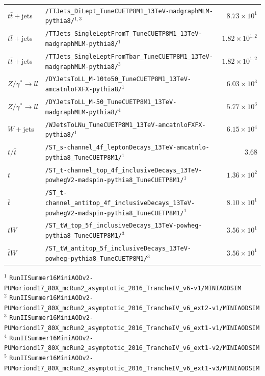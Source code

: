 \begin{landscape}
\begin{longtable}{lp{6.0in}r}
\midrule
$t\bar{t}+$jets & \texttt{/TTJets\_DiLept\_TuneCUETP8M1\_13TeV-madgraphMLM-pythia8/}$^{1,3}$ & $8.73 \times 10^{1}$ \\
$t\bar{t}+$jets & \texttt{/TTJets\_SingleLeptFromT\_TuneCUETP8M1\_13TeV-madgraphMLM-pythia8/}$^{1}$ & $1.82 \times 10^{1,2}$ \\
$t\bar{t}+$jets & \texttt{/TTJets\_SingleLeptFromTbar\_TuneCUETP8M1\_13TeV-madgraphMLM-pythia8/}$^{3}$ & $1.82 \times 10^{1,2}$ \\
$Z/\gamma^{*}\rightarrow ll$ & \texttt{/DYJetsToLL\_M-10to50\_TuneCUETP8M1\_13TeV-amcatnloFXFX-pythia8/}$^{1}$ & $6.03 \times 10^{3}$ \\
$Z/\gamma^{*}\rightarrow ll$ & \texttt{/DYJetsToLL\_M-50\_TuneCUETP8M1\_13TeV-madgraphMLM-pythia8/}$^{4}$ & $5.77 \times 10^{3}$ \\
$W+$jets & \texttt{/WJetsToLNu\_TuneCUETP8M1\_13TeV-amcatnloFXFX-pythia8/}$^{1}$ & $6.15 \times 10^{4}$ \\
$t/\bar{t}$ & \texttt{/ST\_s-channel\_4f\_leptonDecays\_13TeV-amcatnlo-pythia8\_TuneCUETP8M1/}$^{1}$ & $3.68$ \\
$t$ & \texttt{/ST\_t-channel\_top\_4f\_inclusiveDecays\_13TeV-powhegV2-madspin-pythia8\_TuneCUETP8M1/}$^{1}$ & $1.36 \times 10^{2}$ \\
$\bar{t}$ & \texttt{/ST\_t-channel\_antitop\_4f\_inclusiveDecays\_13TeV-powhegV2-madspin-pythia8\_TuneCUETP8M1/}$^{1}$ & $8.10 \times 10^{1}$ \\
$tW$ & \texttt{/ST\_tW\_top\_5f\_inclusiveDecays\_13TeV-powheg-pythia8\_TuneCUETP8M1/}$^{3}$ & $3.56 \times 10^{1}$ \\
$\bar{t}W$ & \texttt{/ST\_tW\_antitop\_5f\_inclusiveDecays\_13TeV-powheg-pythia8\_TuneCUETP8M1/}$^{3}$ & $3.56 \times 10^{1}$ \\

\end{longtable}
{\footnotesize
$^{1}$ \texttt{RunIISummer16MiniAODv2-PUMoriond17\_80X\_mcRun2\_asymptotic\_2016\_TrancheIV\_v6-v1/MINIAODSIM} \\
$^{2}$ \texttt{RunIISummer16MiniAODv2-PUMoriond17\_80X\_mcRun2\_asymptotic\_2016\_TrancheIV\_v6\_ext2-v1/MINIAODSIM} \\
$^{3}$ \texttt{RunIISummer16MiniAODv2-PUMoriond17\_80X\_mcRun2\_asymptotic\_2016\_TrancheIV\_v6\_ext1-v1/MINIAODSIM} \\
$^{4}$ \texttt{RunIISummer16MiniAODv2-PUMoriond17\_80X\_mcRun2\_asymptotic\_2016\_TrancheIV\_v6\_ext1-v2/MINIAODSIM} \\
$^{5}$ \texttt{RunIISummer16MiniAODv2-PUMoriond17\_80X\_mcRun2\_asymptotic\_2016\_TrancheIV\_v6\_ext1-v3/MINIAODSIM} \\
} %

\end{landscape}



